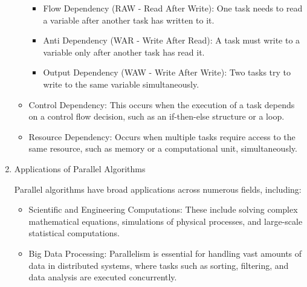 \documentclass[a4paper, 10pt]{book}
\begin{document}
\begin{enumerate}
\begin{itemize}
                    \begin{itemize}
                        
                        \item {\bold Flow Dependency (RAW - Read After Write):} One task needs to read a variable after another task has written to it.
                        
                        \item {\bold Anti Dependency (WAR - Write After Read):} A task must write to a variable only after another task has read it.

                        \item {\bold Output Dependency (WAW - Write After Write):} Two tasks try to write to the same variable simultaneously.

                    \end{itemize}
                    
                    \item {\bold Control Dependency:} This occurs when the execution of a task depends on a control flow decision, such as an if-then-else structure or a loop.

                    \item {\bold Resource Dependency:} Occurs when multiple tasks require access to the same resource, such as memory or a computational unit, simultaneously.

                \end{itemize}

            \item {\bold Applications of Parallel Algorithms}
            
                Parallel algorithms have broad applications across numerous fields, including:

                \begin{itemize}
                    
                    \item {\bold Scientific and Engineering Computations:} These include solving complex mathematical equations, simulations of physical processes, and large-scale statistical computations.

                    \item {\bold Big Data Processing:} Parallelism is essential for handling vast amounts of data in distributed systems, where tasks such as sorting, filtering, and data analysis are executed concurrently.


\end{itemize}
\end{enumerate}
\end{document}
